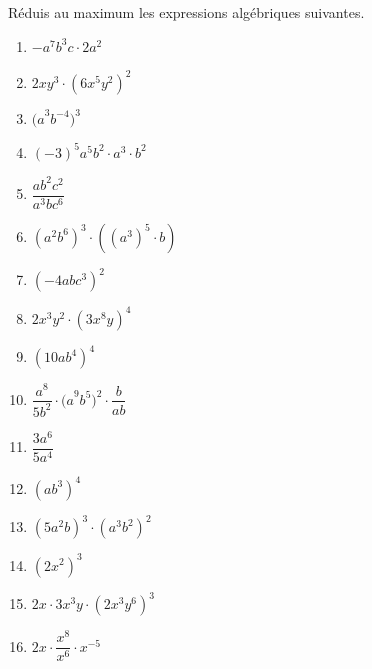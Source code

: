 %
%
  Réduis au maximum les expressions algébriques suivantes.
  \begin{enumerate}[cols=2, itemsep=2ex]
    \item $- a^{7}b^{3}c \cdot 2a^{2}$
    \item $2xy^{3} \cdot \left( 6x^{5}y^{2} \right)^{2}$
    \item ${(a}^{3}b^{- 4})^3$
    \item $( - 3)^{5}a^{5}b^{2} \cdot a^{3} \cdot b^{2}$
    \item $\dfrac{ab^{2}c^{2}}{a^{3}bc^{6}}$
    \item $\left( a^{2}b^{6} \right)^{3} \cdot \left( \left( a^{3} \right)^{5} \cdot b \right)$
    \item $\left( - 4abc^{3} \right)^{2}$
    \item $2x^{3}y^{2} \cdot \left( 3x^{8}y \right)^{4}$
    \item $\left( 10ab^{4} \right)^{4}$
    \item $\dfrac{a^{8}}{5b^{2}} \cdot {(a}^{9}b^{5})^2 \cdot \dfrac{b}{ab}$
    \item $\dfrac{3a^{6}}{5a^{4}}$
    \item $\left( ab^{3} \right)^{4}$
    \item $\left( 5a^{2}b \right)^{3} \cdot \left( a^{3}b^{2} \right)^{2}$
    \item $(2x^{2})^3$
    \item $2x \cdot 3x^{3}y \cdot (2x^{3}y^{6})^3$
    \item $2x \cdot \dfrac{x^{8}}{x^{6}} \cdot x^{- 5}$
  \end{enumerate}
